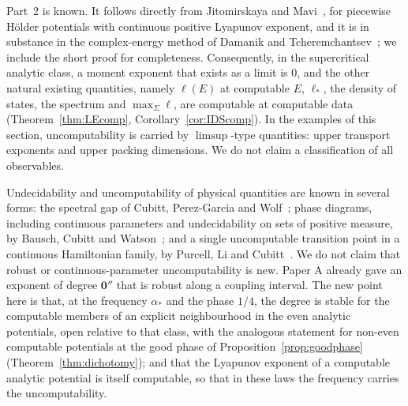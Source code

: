 Part~2 is known. It follows directly from Jitomirskaya and Mavi~\cite[Theorem~1.7(1)]{JitomirskayaMavi2017}, for piecewise H\"older potentials with continuous positive Lyapunov exponent, and it is in substance in the complex-energy method of Damanik and Tcheremchantsev~\cite{DT2007}; we include the short proof for completeness. Consequently, in the supercritical analytic class, a moment exponent that exists as a limit is $0$, and the other natural existing quantities, namely $\ell(E)$ at computable $E$, $\ell_*$, the density of states, the spectrum and $\max_\Sigma\ell$, are computable at computable data (Theorem~\ref{thm:LEcomp}, Corollary~\ref{cor:IDScomp}). In the examples of this section, uncomputability is carried by $\limsup$-type quantities: upper transport exponents and upper packing dimensions. We do not claim a classification of all observables.

\begin{remark}\label{rem:uncompprior}
Undecidability and uncomputability of physical quantities are known in several forms: the spectral gap of Cubitt, Perez-Garcia and Wolf~\cite{CPGW2015}; phase diagrams, including continuous parameters and undecidability on sets of positive measure, by Bausch, Cubitt and Watson~\cite{BCW2021}; and a single uncomputable transition point in a continuous Hamiltonian family, by Purcell, Li and Cubitt~\cite{PLC2024}. We do not claim that robust or continuous-parameter uncomputability is new. Paper A already gave an exponent of degree $\mathbf 0''$ that is robust along a coupling interval. The new point here is that, at the frequency $\alpha_*$ and the phase $1/4$, the degree is stable for the computable members of an explicit neighbourhood in the even analytic potentials, open relative to that class, with the analogous statement for non-even computable potentials at the good phase of Proposition~\ref{prop:goodphase} (Theorem~\ref{thm:dichotomy}); and that the Lyapunov exponent of a computable analytic potential is itself computable, so that in these laws the frequency carries the uncomputability.
\end{remark}
